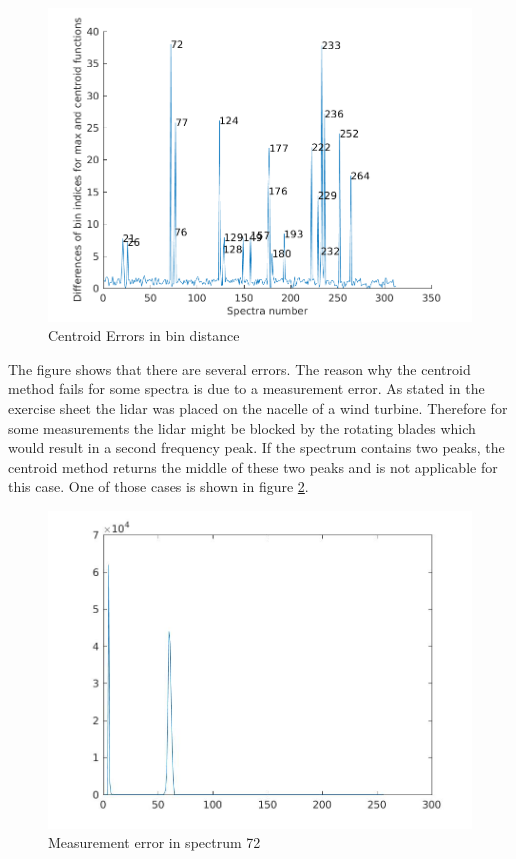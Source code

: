 \documentclass[10pt]{article}
\begin{document}
\begin{figure}[H]
\includegraphics[width=1\linewidth]{../Exercises_and_Tasks/ex1/figures/failures.png}
\caption{Centroid Errors in bin distance}
\label{fig:failures}
\end{figure}

The figure shows that there are several errors. The reason why the centroid method fails for some spectra is due to a measurement error. As stated in the exercise sheet the lidar was placed on the nacelle of a wind turbine. Therefore for some measurements the lidar might be blocked by the rotating blades which would result in a second frequency peak. If the spectrum contains two peaks, the centroid method returns the middle of these two peaks and is not applicable for this case.
One of those cases is shown in figure \ref{fig:measurement_error}.

\begin{figure}[H]
\includegraphics[width=1\linewidth]{../Exercises_and_Tasks/ex1/figures/spectra_noisecancels_normed_72.jpg}
\caption{Measurement error in spectrum 72}
\label{fig:measurement_error}
\end{figure}
\end{document}
